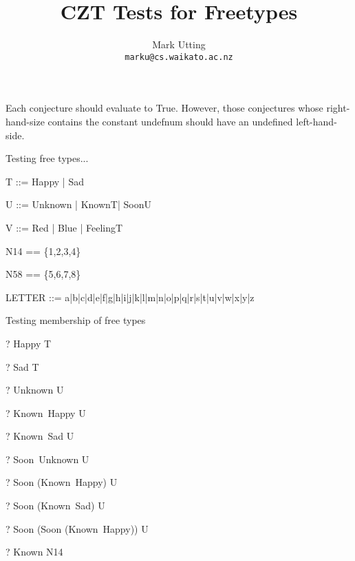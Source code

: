 \documentclass{article}
\title{CZT Tests for Freetypes}
\author{Mark Utting \\ \texttt{marku@cs.waikato.ac.nz}}
\begin{document}
\maketitle

Each conjecture should evaluate to True.
However, those conjectures whose right-hand-size contains
the constant undefnum should have an undefined left-hand-side.


Testing free types...

\begin{zed}
T ::= Happy | Sad
\end{zed}

\begin{zed}
U ::= Unknown | Known\ldata T\rdata | Soon\ldata U\rdata
\end{zed}

\begin{zed}
V ::= Red | Blue | Feeling\ldata T \rdata
\end{zed}

\begin{zed}
N14 == \{1,2,3,4\}
\end{zed}

\begin{zed}
N58 == \{5,6,7,8\}
\end{zed}

\begin{zed}
LETTER ::= a|b|c|d|e|f|g|h|i|j|k|l|m|n|o|p|q|r|s|t|u|v|w|x|y|z
\end{zed}

Testing membership of free types
\begin{zed} \vdash?  Happy \in T \end{zed}
\begin{zed} \vdash?  Sad \in T \end{zed}
\begin{zed} \vdash?  Unknown \in U \end{zed}
\begin{zed} \vdash?  Known~Happy \in U \end{zed}
\begin{zed} \vdash?  Known~Sad \in U \end{zed}
\begin{zed} \vdash?  Soon~Unknown \in U \end{zed}
\begin{zed} \vdash?  Soon (Known~Happy) \in U \end{zed}
\begin{zed} \vdash?  Soon (Known~Sad) \in U \end{zed}
\begin{zed} \vdash?  Soon (Soon (Known~Happy)) \in U \end{zed}
\begin{zed} \vdash?  Known \notin N14 \end{zed}
\end{document}
